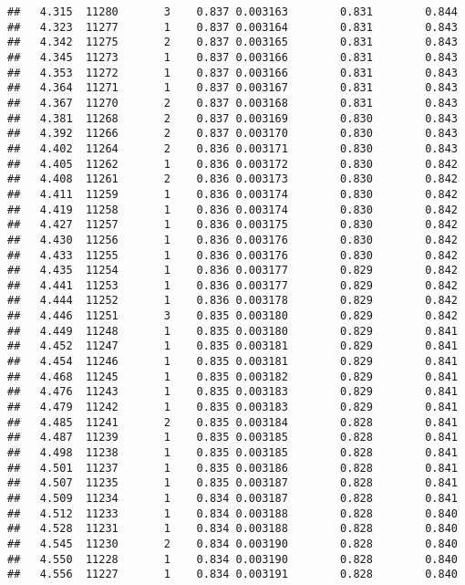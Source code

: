 \documentclass[
]{book}
\begin{document}
\begin{verbatim}
##   4.315  11280       3    0.837 0.003163        0.831        0.844
##   4.323  11277       1    0.837 0.003164        0.831        0.843
##   4.342  11275       2    0.837 0.003165        0.831        0.843
##   4.345  11273       1    0.837 0.003166        0.831        0.843
##   4.353  11272       1    0.837 0.003166        0.831        0.843
##   4.364  11271       1    0.837 0.003167        0.831        0.843
##   4.367  11270       2    0.837 0.003168        0.831        0.843
##   4.381  11268       2    0.837 0.003169        0.830        0.843
##   4.392  11266       2    0.837 0.003170        0.830        0.843
##   4.402  11264       2    0.836 0.003171        0.830        0.843
##   4.405  11262       1    0.836 0.003172        0.830        0.842
##   4.408  11261       2    0.836 0.003173        0.830        0.842
##   4.411  11259       1    0.836 0.003174        0.830        0.842
##   4.419  11258       1    0.836 0.003174        0.830        0.842
##   4.427  11257       1    0.836 0.003175        0.830        0.842
##   4.430  11256       1    0.836 0.003176        0.830        0.842
##   4.433  11255       1    0.836 0.003176        0.830        0.842
##   4.435  11254       1    0.836 0.003177        0.829        0.842
##   4.441  11253       1    0.836 0.003177        0.829        0.842
##   4.444  11252       1    0.836 0.003178        0.829        0.842
##   4.446  11251       3    0.835 0.003180        0.829        0.842
##   4.449  11248       1    0.835 0.003180        0.829        0.841
##   4.452  11247       1    0.835 0.003181        0.829        0.841
##   4.454  11246       1    0.835 0.003181        0.829        0.841
##   4.468  11245       1    0.835 0.003182        0.829        0.841
##   4.476  11243       1    0.835 0.003183        0.829        0.841
##   4.479  11242       1    0.835 0.003183        0.829        0.841
##   4.485  11241       2    0.835 0.003184        0.828        0.841
##   4.487  11239       1    0.835 0.003185        0.828        0.841
##   4.498  11238       1    0.835 0.003185        0.828        0.841
##   4.501  11237       1    0.835 0.003186        0.828        0.841
##   4.507  11235       1    0.835 0.003187        0.828        0.841
##   4.509  11234       1    0.834 0.003187        0.828        0.841
##   4.512  11233       1    0.834 0.003188        0.828        0.840
##   4.528  11231       1    0.834 0.003188        0.828        0.840
##   4.545  11230       2    0.834 0.003190        0.828        0.840
##   4.550  11228       1    0.834 0.003190        0.828        0.840
##   4.556  11227       1    0.834 0.003191        0.828        0.840

\end{verbatim}
\end{document}

